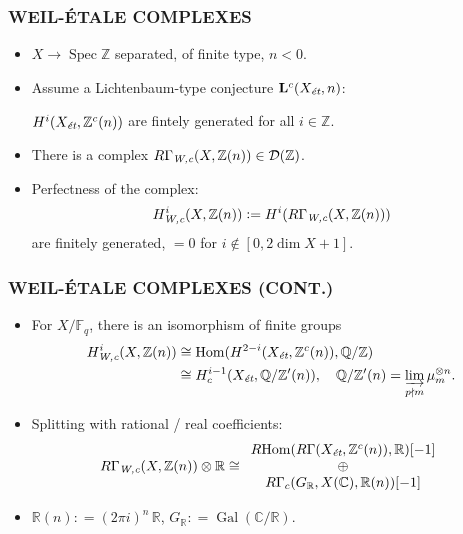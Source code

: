 \documentclass[handout]{beamer}
\newcommand{\CC}{\mathbb{C}}
\newcommand{\FF}{\mathbb{F}}
\newcommand{\QQ}{\mathbb{Q}}
\newcommand{\RR}{\mathbb{R}}
\newcommand{\ZZ}{\mathbb{Z}}
\DeclareMathOperator{\Gal}{Gal}
\newcommand{\dfn}{\mathrel{\mathop:}=}
\DeclareMathOperator{\Hom}{Hom}
\DeclareMathOperator{\Spec}{Spec}
\newcommand{\et}{\text{\it ét}}
\newcommand{\Wc}{\text{\it W,c}}
\newcommand{\RHom}{R\!\Hom}
\begin{document}

\begin{frame}
  \frametitle{WEIL-ÉTALE COMPLEXES}

  \begin{itemize}
  \item<2-> $X \to \Spec \ZZ$ separated, of finite type, $n < 0$.

  \item<3-> Assume a Lichtenbaum-type conjecture $\mathbf{L}^c (X_\et, n)$:

    $H^i (X_\et, \ZZ^c(n))$ are fintely generated for all $i \in \ZZ$.

  \item<4-> There is a complex $R\Gamma_\Wc (X, \ZZ(n)) \in \mathcal{D} (\ZZ)$.

  \item<5-> Perfectness of the complex:
    \[ H^i_\Wc (X, \ZZ(n)) \dfn H^i (R\Gamma_\Wc (X, \ZZ(n))) \]
    are finitely generated, $= 0$ for $i \notin [0, 2\dim X + 1]$.
  \end{itemize}
\end{frame}


\begin{frame}
  \frametitle{WEIL-ÉTALE COMPLEXES (CONT.)}

  \begin{itemize}
  \item<2-> For $X/\FF_q$, there is an isomorphism of finite groups
    \begin{align*}
      H^i_\Wc (X, \ZZ (n)) & \cong \Hom (H^{2-i} (X_\et, \ZZ^c (n)), \QQ/\ZZ) \\
                           & \cong H^{i-1}_c (X_\et, \QQ/\ZZ' (n)), \quad \QQ/\ZZ' (n) = \varinjlim_{p\nmid m} \mu_m^{\otimes n}.
    \end{align*}

  \item<3-> Splitting with rational / real coefficients:
    \[ R\Gamma_\Wc (X, \ZZ(n)) \otimes \RR \cong
      \begin{array}{c}
        \RHom(R\Gamma(X_\et, \ZZ^c(n)), \RR)[-1]\\
        \oplus \\
        R\Gamma_c (G_\RR, X(\CC), \RR(n))[-1]
      \end{array} \]

  \item<4-> $\RR(n) \dfn (2\pi i)^n\,\RR$, $G_\RR \dfn \Gal (\CC/\RR)$.
  \end{itemize}
\end{frame}
\end{document}
